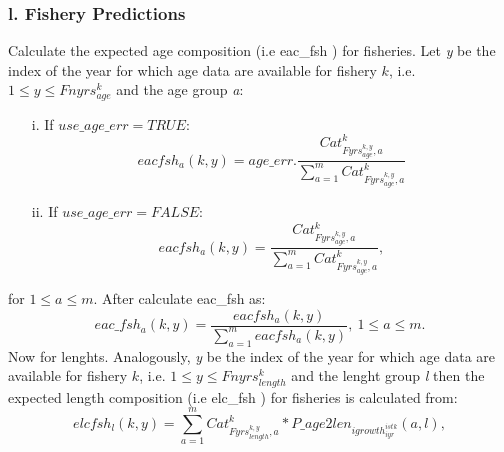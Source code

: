 \documentclass{article}
\begin{document}
\subsubsection{l. Fishery Predictions}
Calculate the expected age composition (i.e eac\_fsh
) for fisheries. Let \textit{y} be the index of the year for which age data are available for fishery $k$, i.e.   $1\leq y \leq Fnyrs^k_{age}$ and the age group \textit{a}:
\begin{itemize}
\item [i.] If $use\_age\_err=TRUE$:
    \begin{equation}
    {eac{fsh}}_a(k,y)=age\_err.\dfrac{Cat_{Fyrs^{k,y}_{age},a}^k}{\displaystyle\sum_{a=1}^mCat_{Fyrs^{k,y}_{age},a}^k}
\end{equation}
\item [ii.] If $use\_age\_err=FALSE$:
\begin{equation}
    eacfsh_a(k,y)=\dfrac{Cat_{Fyrs^{k,y}_{age},a}^k}{\displaystyle\sum_{a=1}^mCat_{Fyrs^{k,y}_{age},a}^k},
\end{equation}
\end{itemize}
for $1\leq a \leq m$.
After calculate eac\_fsh as:
\begin{equation}
    eac\_fsh_a(k,y)=\dfrac{eacfsh_a(k,y)}{\displaystyle\sum_{a=1}^m eacfsh_a(k,y)}, \ 1\leq a \leq m.
\end{equation}
Now for lenghts. Analogously, \textit{y} be the index of the year for which age data are available for fishery $k$, i.e.   $1\leq y \leq Fnyrs^k_{length}$ and the lenght group \textit{l} then the expected length composition (i.e elc\_fsh
) for fisheries is calculated from: 
\begin{equation}
elcfsh_l(k,y)=\sum_{a=1}^m Cat_{Fyrs^{k,y}_{length},a}^k*P\_age2len_{igrowth^{istk}_{iyr}}(a,l),
\end{equation}
\end{document}
